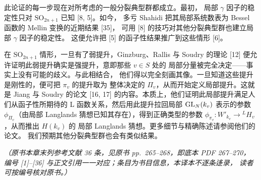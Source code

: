 此论证的每一步现在对所考虑的一般分裂典型群都成立。最初，
局部 $\gamma$ 因子的稳定性只对 $\mathrm{SO}_{2n+1}$ 已知 [8, 5]。如今，
多亏 Shahidi 把其局部系统数表为 Bessel 函数的 Mellin 变换的近期结果 [35]，
可用 [8] 的技巧对其他分裂典型群也建立局部 $\gamma$ 因子的稳定性。
这便允许把 [5] 的函子性结果推广到这些情形 [6]。

在 $\mathrm{SO}_{2n+1}$ 情形，一旦有了弱提升，Ginzburg、Rallis 与 Soudry
的理论 [12] 便允许证明此弱提升确实是强提升，意即那些 $v\in S$ 处的
局部分量被完全决定——事实上没有可能的歧义。与此相结合，
他们得以完全刻画其像。一旦知道这些提升是刚性的，便可把 $\pi_v$ 的提升取为
整体决定的 $\Pi_v$，从而开始定义局部提升。这就是 Jiang 与 Soudry 的论文
[16, 17] 的内容。本质上，他们证明此局部提升满足人们从函子性所期待的
L 函数关系，然后用此提升拉回局部 $\mathrm{GL}_N(k_v)$ 表示的参数
$\phi_{\Pi_v}$（由局部 Langlands 猜想已知其存在），得到正确类型的参数
$\phi_{\pi_v}\colon W'_{k_v}\to{}^{L}H_v$，从而推出 $H(k_v)$ 的
局部 Langlands 猜想。更多细节与精确陈述请参阅他们的论文。
我们预期其他分裂典型群也会有类似结果。

\par\medskip
\noindent\textit{（原书本章末列参考文献 36 条，见原书 pp.~265--268，即底本 PDF 267--270，
编号 [1]--[36] 与正文引用一一对应；条目为书目信息，本译本不逐条迻录，
读者可按编号核对原书。）}

